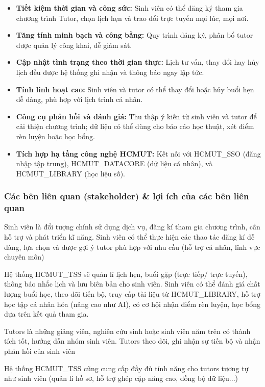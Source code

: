 \begin{itemize}
	\item \textbf{Tiết kiệm thời gian và công sức:} Sinh viên có thể đăng ký tham gia chương trình Tutor, chọn lịch hẹn và trao đổi trực tuyến mọi lúc, mọi nơi.
	\item \textbf{Tăng tính minh bạch và công bằng:} Quy trình đăng ký, phân bổ tutor được quản lý công khai, dễ giám sát.
	\item \textbf{Cập nhật tình trạng theo thời gian thực:} Lịch tư vấn, thay đổi hay hủy lịch đều được hệ thống ghi nhận và thông báo ngay lập tức.
	\item \textbf{Tính linh hoạt cao:} Sinh viên và tutor có thể thay đổi hoặc hủy buổi hẹn dễ dàng, phù hợp với lịch trình cá nhân.
	\item \textbf{Công cụ phản hồi và đánh giá:} Thu thập ý kiến từ sinh viên và tutor để cải thiện chương trình; dữ liệu có thể dùng cho báo cáo học thuật, xét điểm rèn luyện hoặc học bổng.
	\item \textbf{Tích hợp hạ tầng công nghệ HCMUT:} Kết nối với HCMUT\_SSO (đăng nhập tập trung), HCMUT\_DATACORE (dữ liệu cá nhân), và HCMUT\_LIBRARY (học liệu số).
\end{itemize}

\subsubsection{Các bên liên quan (stakeholder) \& lợi ích của các bên liên quan}
Sinh viên là đổi tượng chính sử dụng dịch vụ, đăng kí tham gia chương trình, cần hỗ trợ và phát triển kĩ năng. Sinh viên có thể thực hiện các thao tác đăng kí dễ dàng, lựa chọn và được gợi ý tutor phù hợp với nhu cầu (hỗ trợ cá nhân, lĩnh vực chuyên môn)

Hệ thống HCMUT\_TSS sẽ quản lí lịch hẹn, buổi gặp (trực tiếp/ trực tuyến), thông báo nhắc lịch và lưu biên bản cho sinh viên. Sinh viên có thể đánh giá chất lượng buổi học, theo dõi tiến bộ, truy cấp tài liệu từ HCMUT\_LIBRARY, hỗ trợ học tập cá nhân hóa (nâng cao như AI), có cơ hội nhận điểm rèn luyện, học bổng dựa trên kết quả tham gia.

Tutors là những giảng viên, nghiên cứu sinh hoặc sinh viên năm trên có thành tích tốt, hướng dẫn nhóm sinh viên. Tutors theo dõi, ghi nhận sự tiến bộ và nhận phản hồi của sinh viên

Hệ thống HCMUT\_TSS cũng cung cấp đầy đủ tính năng cho tutors tương tự như sinh viên (quản lí hồ sơ, hỗ trợ ghép cặp năng cao, đồng bộ dữ liệu...)

